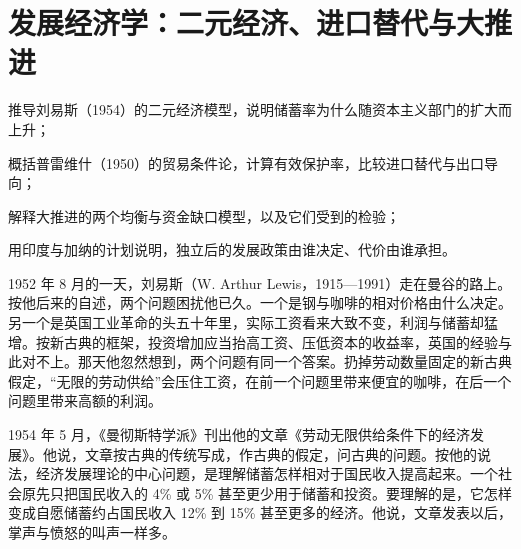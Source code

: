 \chapter{发展经济学：二元经济、进口替代与大推进}\label{ch:development}

\begin{chapterguide}
\begin{guidegoals}
\item 推导刘易斯（1954）的二元经济模型，说明储蓄率为什么随资本主义部门的扩大而上升；
\item 概括普雷维什（1950）的贸易条件论，计算有效保护率，比较进口替代与出口导向；
\item 解释大推进的两个均衡与资金缺口模型，以及它们受到的检验；
\item 用印度与加纳的计划说明，独立后的发展政策由谁决定、代价由谁承担。
\end{guidegoals}
\end{chapterguide}

1952 年 8 月的一天，刘易斯（W. Arthur Lewis，1915—1991）走在曼谷的路上\cite{lewisbio1979,loc40,gnd40}。按他后来的自述，两个问题困扰他已久\cite{lewisbio1979}。一个是钢与咖啡的相对价格由什么决定。另一个是英国工业革命的头五十年里，实际工资看来大致不变，利润与储蓄却猛增\cite{lewisbio1979}。按新古典的框架，投资增加应当抬高工资、压低资本的收益率，英国的经验与此对不上\cite{lewisbio1979}。那天他忽然想到，两个问题有同一个答案。扔掉劳动数量固定的新古典假定，“无限的劳动供给”会压住工资，在前一个问题里带来便宜的咖啡，在后一个问题里带来高额的利润\cite{lewisbio1979}。

1954 年 5 月，《曼彻斯特学派》刊出他的文章《劳动无限供给条件下的经济发展》\cite{lewis1954}。他说，文章按古典的传统写成，作古典的假定，问古典的问题\cite{lewis1954}。按他的说法，经济发展理论的中心问题，是理解储蓄怎样相对于国民收入提高起来\cite{lewis1954}。一个社会原先只把国民收入的 4\% 或 5\% 甚至更少用于储蓄和投资。要理解的是，它怎样变成自愿储蓄约占国民收入 12\% 到 15\% 甚至更多的经济\cite{lewis1954}。他说，文章发表以后，掌声与愤怒的叫声一样多\cite{lewisbio1979}。

